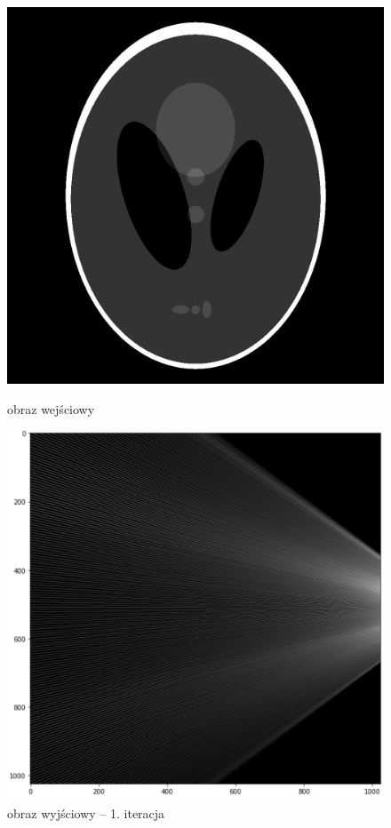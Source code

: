 \documentclass[polish,polish,a4paper]{article}
\begin{document}
				\begin{figure}[!h]
					\centering
					\begin{minipage}{0.45\linewidth}
						\includegraphics[width=\linewidth]{../tomograf-zdjecia/Shepp_logan.jpg} 
						\caption{obraz wejściowy}
					\end{minipage}
					\hfill
					\begin{minipage}{0.45\linewidth}
						\includegraphics[width=\linewidth]{img/out_1.png}
						\caption{obraz wyjściowy -- 1. iteracja}
					\end{minipage}
				\end{figure} 
				
\end{document}
